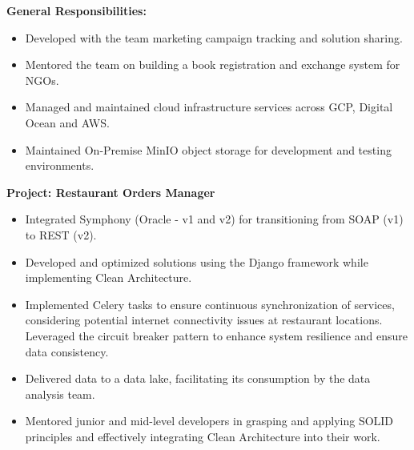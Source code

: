 \documentclass[10pt,a4paper]{altacv}
\begin{document}

\textbf{General Responsibilities:}
\begin{itemize}
    \setlength{\itemindent}{0.5em}
    \item[--] Developed with the team marketing campaign tracking and solution sharing.
    \item[--] Mentored the team on building a book registration and exchange system for NGOs.
    \item[--] Managed and maintained cloud infrastructure services across GCP, Digital Ocean and AWS.
    \item[--] Maintained On-Premise MinIO object storage for development and testing environments.
\end{itemize}

\textbf{Project: Restaurant Orders Manager}
\begin{itemize}
    \setlength{\itemindent}{0.5em}
    \item[--] Integrated Symphony (Oracle - v1 and v2) for transitioning from SOAP (v1) to REST (v2).
    \item[--] Developed and optimized solutions using the Django framework while implementing Clean Architecture.
    \item[--] Implemented Celery tasks to ensure continuous synchronization of services, considering potential internet connectivity issues at restaurant locations. Leveraged the circuit breaker pattern to enhance system resilience and ensure data consistency.
    \item[--] Delivered data to a data lake, facilitating its consumption by the data analysis team.
    \item[--] Mentored junior and mid-level developers in grasping and applying SOLID principles and effectively integrating Clean Architecture into their work.
\end{itemize}
\end{document}
